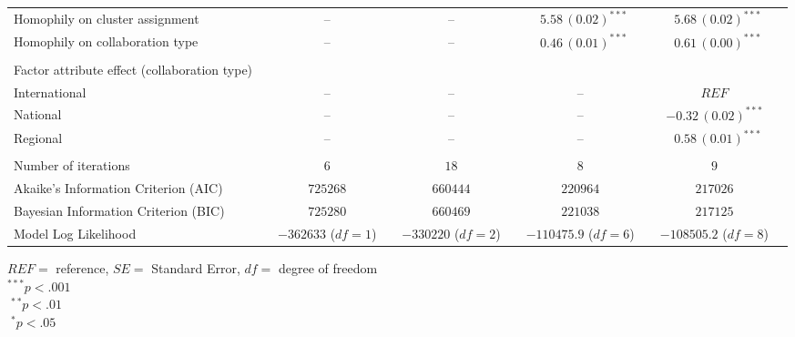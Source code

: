 \begin{table}[!h]
\begin{tabular}{@{}lcclclclcl@{}}
        Homophily on cluster assignment &  & --   &  & --    &  & $\hspace{6pt}5.58\hspace{2pt}(0.02)^{***}$  &  & $\hspace{6pt}5.68\hspace{2pt}(0.02)^{***}$\\%
        Homophily on collaboration type &  & --   &  & --    &  & $\hspace{6pt}0.46\hspace{2pt}(0.01)^{***}$  &  & $\hspace{6pt}0.61\hspace{2pt}(0.00)^{***}$\\ \\
        Factor attribute effect (collaboration type) &  &    &  &  &   &  &  & \\
        \hspace{10pt}International &  & --   &  & --   &  & --  &  & $REF$\\
        \hspace{10pt}National &  & --   &  & --   &  & --  &  & $-0.32\hspace{2pt}(0.02)^{***}$\\
        \hspace{10pt}Regional &  & --   &  & --   &  & --   &  & $\hspace{6pt}0.58\hspace{2pt}(0.01)^{***}$\\ \\ \midrule
        Number of iterations  &   & $6$   &  & $18$ &  & $8$  &  & $9$\\
        Akaike's Information Criterion (AIC)  &   & $725268$   &  & $660444$ &  & $220964$  &  & $217026$\\
        Bayesian Information Criterion (BIC)  &   & $725280$   &  & $660469$ &  & $221038$  &  & $217125$\\
        Model Log Likelihood  &   & $-362633$ ($df=1$)   &  & $-330220$ ($df=2$) &  & $-110475.9$ ($df=6$)  &  & $-108505.2$ ($df=8$)\\
        \bottomrule
      \end{tabular}
      \hspace*{-1cm}
      \raggedright \scriptsize
      $REF=$ reference, $SE=$ Standard Error, $df=$ degree of freedom\\
      ${ }^{***} p < .001$\\
      ${ }^{\hspace{3pt}**} p < .01$\\
      ${ }^{\hspace{5pt}*} p < .05$
\end{table}

